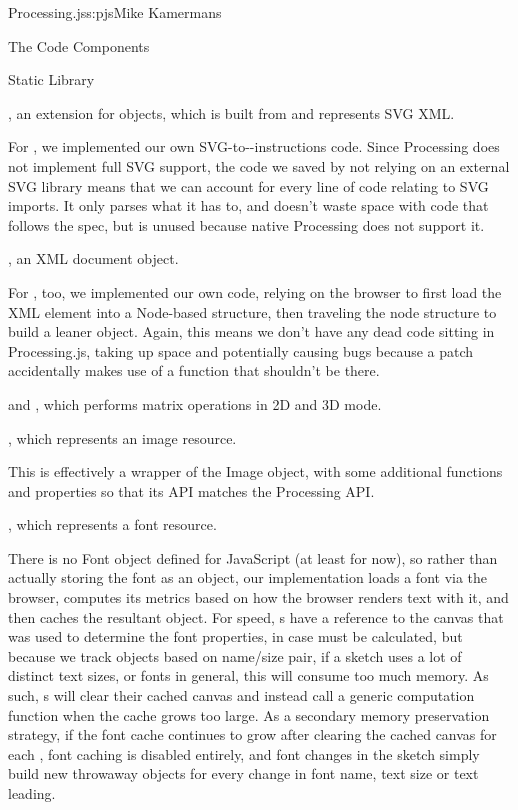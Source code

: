 \begin{aosachapter}{Processing.js}{s:pjs}{Mike Kamermans}
\begin{aosasect1}{The Code Components}
\begin{aosasect2}{Static Library}
\begin{aosaitemize}
\item {}, an extension for  objects, which is built from and
  represents SVG XML.

For , we implemented our own
SVG-to--instructions code. Since
Processing does not implement full SVG support, the code we saved by
not relying on an external SVG library means that we can account for
every line of code relating to SVG imports. It only parses what it has
to, and doesn't waste space with code that follows the spec, but is
unused because native Processing does not support it.

\item {}, an XML document object.

For , too, we implemented our own code, relying on the
browser to first load the XML element into a Node-based structure,
then traveling the node structure to build a leaner object. Again,
this means we don't have any dead code sitting in Processing.js,
taking up space and potentially causing bugs because a patch
accidentally makes use of a function that shouldn't be there.

\item {} and , which performs matrix operations in 2D and 3D
  mode.

\item {}, which represents an image resource.

This is effectively a wrapper of the Image object, with some
additional functions and properties so that its API matches the
Processing API.

\item {}, which represents a font resource.

There is no Font object defined for JavaScript (at least for now), so
rather than actually storing the font as an object, our 
implementation loads a font via the browser, computes its metrics
based on how the browser renders text with it, and then caches the
resultant  object. For speed, s have a reference to the
canvas that was used to determine the font properties, in case
 must be calculated, but because we track  objects based
on name/size pair, if a sketch uses a lot of distinct text sizes, or
fonts in general, this will consume too much memory. As such, s
will clear their cached canvas and instead call a generic 
computation function when the cache grows too large. As a secondary
memory preservation strategy, if the font cache continues to grow
after clearing the cached canvas for each , font caching is
disabled entirely, and font changes in the sketch simply build new
throwaway  objects for every change in font name, text size or
text leading.


\end{aosaitemize}
\end{aosasect2}
\end{aosasect1}
\end{aosachapter}

